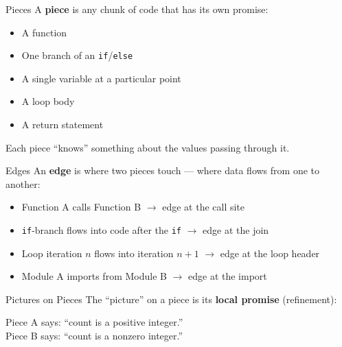 \documentclass[aspectratio=169,10pt]{beamer}
\begin{document}
\begin{frame}{Pieces}
A \textbf{piece} is any chunk of code that has its own promise:
\vspace{0.3em}
\begin{itemize}
  \item A function
  \item One branch of an \texttt{if}/\texttt{else}
  \item A single variable at a particular point
  \item A loop body
  \item A return statement
\end{itemize}
\vspace{0.3em}
Each piece ``knows'' something about the values passing through it.
\end{frame}

\begin{frame}{Edges}
An \textbf{edge} is where two pieces touch --- where data flows from one to another:
\vspace{0.3em}
\begin{itemize}
  \item Function A calls Function B $\to$ edge at the call site
  \item \texttt{if}-branch flows into code after the \texttt{if} $\to$ edge at the join
  \item Loop iteration $n$ flows into iteration $n+1$ $\to$ edge at the loop header
  \item Module A imports from Module B $\to$ edge at the import
\end{itemize}
\end{frame}

\begin{frame}{Pictures on Pieces}
The ``picture'' on a piece is its \textbf{local promise} (refinement):
\vspace{0.5em}
\begin{center}
\end{center}
\vspace{0.3em}
Piece A says: ``count is a positive integer.''\\
Piece B says: ``count is a nonzero integer.''
\end{frame}
\end{document}
